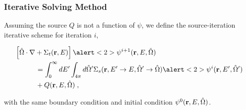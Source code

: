 \documentclass[xcolor=x11names, compress, handout]{beamer}
\begin{document}
\begin{frame}
  \frametitle{Iterative Solving Method}
  
  Assuming the source $Q$ is not a function of $\psi$,  we define the
  source-iteration iterative scheme for iteration $i$,

  \begin{align*}
  &\left[ \oh\cdot  \nabla + \Sigma_t(\rvec,E) \right] \alert<2>{\psi^{i+1}}(\rvec,E,\oh)\\
  & \quad \quad \quad= \int_0^{\infty}dE'\int_{4\pi}d\oh'\Sigma_s(\rvec, E'\rightarrow E,\oh'\rightarrow\oh)
    \alert<2>{\psi^{i}}(\rvec,E',\oh') \\ & \quad \quad \quad+ Q(\rvec, E, \oh)\;,
  \end{align*}

  with the same boundary condition and initial condition
  $\psi^0(\mathbf{r}, E, \hat{\Omega})$.

\end{frame}
\end{document}

